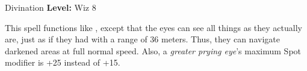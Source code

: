 {Divination}
{
	\textbf{Level:}
	Wiz 8\\
}
{
	This spell functions like , except that the eyes can see all things as they actually are, just as if they had  with a range of 36 meters. Thus, they can navigate darkened areas at full normal speed. Also, a \emph{greater prying eye}'s maximum Spot modifier is +25 instead of +15.

}
